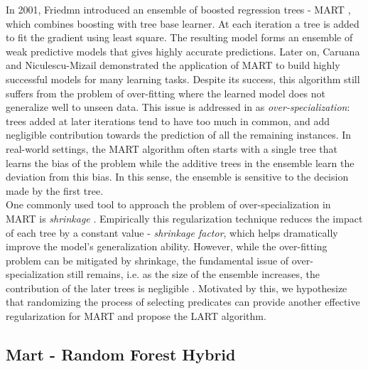 \documentclass{article} %
\begin{document}
In 2001, Friedmn introduced an ensemble of boosted regression trees - MART \cite{mart}, which combines boosting with tree base learner. At each iteration a tree is added to fit the gradient using least square. The resulting model forms an ensemble of weak predictive models that gives highly accurate predictions. Later on, Caruana and Niculescu-Mizail \cite{Caruana06anempirical} demonstrated the application of MART to build highly successful models for many learning tasks. Despite its success, this algorithm still suffers from the problem of over-fitting where the learned model does not generalize well to unseen data. This issue is addressed in \cite{VinayakG15} as \textit{over-specialization}: trees added at later iterations tend to have too much in common, and add negligible contribution towards the prediction of all the remaining instances. In real-world settings, the MART algorithm often starts with a single tree that learns the bias of the problem while the additive trees in the ensemble learn the deviation from this bias. In this sense, the ensemble is sensitive to the decision made by the first tree.\\

One commonly used tool to approach the problem of over-specialization in MART is \textit{shrinkage} \cite{mart}. Empirically this regularization technique reduces the impact of each tree by a constant value - \textit{shrinkage factor}, which helps dramatically improve the model's generalization ability. However, while the over-fitting problem can be mitigated by shrinkage, the fundamental issue of over-specialization still remains, i.e. as the size of the ensemble increases, the contribution of the later trees is negligible \cite{VinayakG15}. Motivated by this, we hypothesize that randomizing the process of selecting predicates can provide another effective regularization for MART and propose the LART algorithm.


\subsection{Mart - Random Forest Hybrid}

\end{document}
